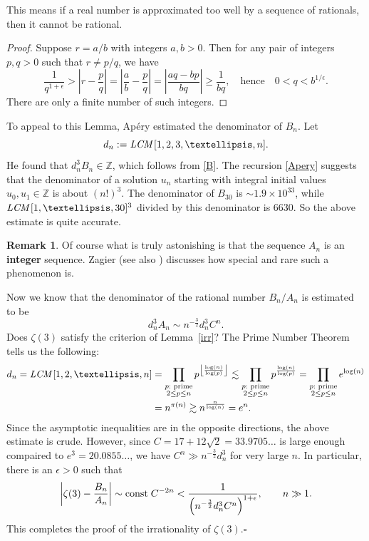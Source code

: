 \documentclass{amsart}
\theoremstyle{definition}
\newtheorem{rem}[thm]{Remark}
\numberwithin{equation}{section}
\numberwithin{figure}{section}
\def\const{{\text{\rm{const}}}}
\def\e{\epsilon}
\def\lcm{{\text{\it{LCM\,}}}}
\newcommand{\bZ}{{\mathbb{Z}}}
\begin{document}
This means if a real number is approximated too well by a
sequence of rationals, then it cannot be rational. 

\begin{proof}
Suppose $r = a/b$ with integers $a,b>0$. Then for any
pair of integers $p,q>0$ such that $r\ne p/q$, we have
$$
\frac{1}{q^{1+\e}} > \left|r-\frac{p}{q}\right| = 
\left|\frac{a}{b}-\frac{p}{q}\right| =\left|\frac{aq-bp}{bq}\right|
\ge \frac{1}{bq}, \quad \text{hence}\quad 0<q<b^{1/\e}.
$$
There are only a finite number of such integers. 
\end{proof}

To appeal to this Lemma, Ap\'ery estimated the denominator of $B_n$. 
Let 
$$
d_n:= \lcm[1,2,3,\dots,n].$$
 He found that  $d_n^3 B_n\in \bZ$, which follows from \eqref{B}.
The recursion \eqref{Apery}
suggests that the denominator of a solution $u_n$ starting with 
integral initial values $u_0, u_1\in \bZ$ is about $(n!)^3$. 
The denominator of $B_{30}$ is  $\sim 1.9\times 10^{33}$, while
$\lcm[1,\dots,30]^3$ divided by this denominator is $6630$. 
So the above estimate is quite accurate. 

\begin{rem}
Of course what is truly astonishing is that the sequence $A_n$ is an 
\textbf{integer}
sequence. Zagier \cite{Zagier} (see also \cite{KZ}) discusses how special and
rare such a  phenomenon is. 
\end{rem}

Now we know that the denominator of the rational number 
${B_n}/{A_n}$ is estimated to be 
$$
d_n^3A_n \sim  n^{-\frac{3}{2}}d_n^3 C^n.
$$
Does $\zeta(3)$ 
satisfy the criterion of Lemma~\ref{irr}? 
The Prime Number Theorem tells us the following: 
\begin{align*}
d_n = \lcm[1,2,\dots,n] &= \prod_{\substack{p: \text{ prime}\\
2\le p \le n}} p^{\left\lfloor\frac{\log(n)}{\log(p)}\right\rfloor}
\lesssim \prod_{\substack{p: \text{ prime}\\
2\le p \le n}} p^{\frac{\log(n)}{\log(p)}}
= \prod_{\substack{p: \text{ prime}\\
2\le p \le n}}e^{\log(n)} \\
&= n^{\pi(n)}\gtrsim n^\frac{n}{\log(n)}= e^{n}.
\end{align*}
Since the asymptotic inequalities are in the opposite directions,
the above estimate is  crude. However, since $C=17+12\sqrt{2}=33.9705\dots$ 
is large enough compaired to $e^3
=20.0855\dots$,
we have
$C^n\gg n^{-\frac{3}{2}}d_n^3$ for very large $n$.
In particular, there is  an $\e>0$ such that 
$$
\left|\zeta(3)-\frac{B_n}{A_n}\right|\sim \const \; C^{-2n} <
\frac{1}{\left(n^{-\frac{3}{2}}d_n^3 C^n\right)^{1+\e}}, \qquad n\gg 1.
$$
This completes the proof of the irrationality of  $\zeta(3)$.\hfill$\square$
\end{document}

